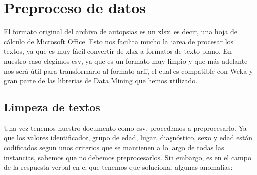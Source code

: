 \documentclass[10pt,a4paper,draft]{article}
\begin{document}
\section{Preproceso de datos}
El formato original del archivo de autopsias es un xlsx, es decir, una hoja de cálculo de Microsoft Office. Esto nos facilita mucho la tarea de procesar los textos, ya que es muy fácil convertir de xlsx a formatos de texto plano. En nuestro caso elegimos csv, ya que es un formato muy limpio y que más adelante nos será útil para transformarlo al formato arff, el cual es compatible con Weka y gran parte de las librerias de Data Mining que hemos utilizado.\\

\subsection{Limpeza de textos}
Una vez tenemos nuestro documento como csv, procedemos a preprocesarlo. Ya que los valores identificador, grupo de edad, lugar, diagnóstico, sexo y edad están codificados segun unos criterios que se mantienen a lo largo de todas las instancias, sabemos que no debemos preprocesarlos. Sin embargo, es en el campo de la respuesta verbal en el que tenemos que solucionar algunas anomalías:
\end{document}
